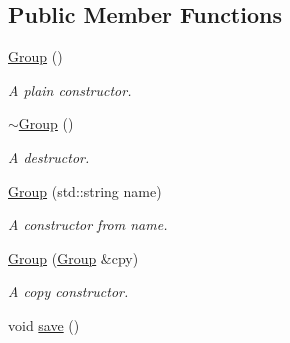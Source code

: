 \subsection*{Public Member Functions}
\begin{DoxyCompactItemize}
\item 
\hypertarget{class_r_c_f_1_1_server_1_1_group_a0ec104eb31b7abf182413cbf416ff15c}{}\hyperlink{class_r_c_f_1_1_server_1_1_group_a0ec104eb31b7abf182413cbf416ff15c}{Group} ()\label{class_r_c_f_1_1_server_1_1_group_a0ec104eb31b7abf182413cbf416ff15c}

\begin{DoxyCompactList}\small\item\em A plain constructor. \end{DoxyCompactList}\item 
\hypertarget{class_r_c_f_1_1_server_1_1_group_a58bc57a716aceb8eb4943e8697725301}{}\hyperlink{class_r_c_f_1_1_server_1_1_group_a58bc57a716aceb8eb4943e8697725301}{$\sim$\+Group} ()\label{class_r_c_f_1_1_server_1_1_group_a58bc57a716aceb8eb4943e8697725301}

\begin{DoxyCompactList}\small\item\em A destructor. \end{DoxyCompactList}\item 
\hyperlink{class_r_c_f_1_1_server_1_1_group_aad28dfbbe7a195265b9b058f8615463c}{Group} (std\+::string name)
\begin{DoxyCompactList}\small\item\em A constructor from name. \end{DoxyCompactList}\item 
\hyperlink{class_r_c_f_1_1_server_1_1_group_ac4bed3ee6740db08910cbbb446a6e4e7}{Group} (\hyperlink{class_r_c_f_1_1_server_1_1_group}{Group} \&cpy)
\begin{DoxyCompactList}\small\item\em A copy constructor. \end{DoxyCompactList}\item 
\hypertarget{class_r_c_f_1_1_server_1_1_group_a72ea007f636d841ea6fa5451372f9867}{}void \hyperlink{class_r_c_f_1_1_server_1_1_group_a72ea007f636d841ea6fa5451372f9867}{save} ()\label{class_r_c_f_1_1_server_1_1_group_a72ea007f636d841ea6fa5451372f9867}


\end{DoxyCompactItemize}
